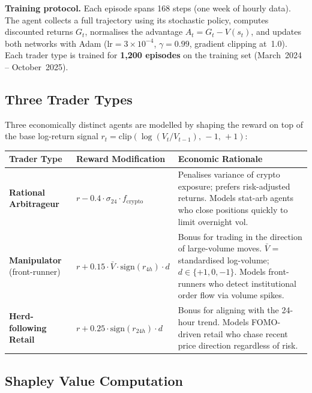 \documentclass[11pt,a4paper]{article}
\begin{document}
\textbf{Training protocol.}  Each episode spans 168 steps (one week of hourly data).  The agent collects a full trajectory using its stochastic policy, computes discounted returns $G_t$, normalises the advantage $A_t = G_t - V(s_t)$, and updates both networks with Adam ($\text{lr}=3\!\times\!10^{-4}$, $\gamma=0.99$, gradient clipping at~1.0).  Each trader type is trained for \textbf{1{,}200 episodes} on the training set (March~2024 -- October~2025).

\subsection{Three Trader Types}

Three economically distinct agents are modelled by shaping the reward on top of the base log-return signal $r_t = \mathrm{clip}\!\left(\log(V_t/V_{t-1}),\,-1,\,+1\right)$:

\begin{table}[h!]
\centering
\small
\renewcommand{\arraystretch}{1.3}
\begin{tabular}{>{\raggedright}p{2.8cm} >{\raggedright}p{5.2cm} >{\raggedright\arraybackslash}p{5.5cm}}
\toprule
\textbf{Trader Type} & \textbf{Reward Modification} & \textbf{Economic Rationale}\\
\midrule
\textcolor{arbblue}{\textbf{Rational Arbitrageur}} &
  $r - 0.4\cdot\sigma_{24}\cdot f_{\text{crypto}}$ &
  Penalises variance of crypto exposure; prefers risk-adjusted returns.  Models stat-arb agents who close positions quickly to limit overnight vol.\\
\textcolor{manipred}{\textbf{Manipulator}} (front-runner) &
  $r + 0.15\cdot\bar{V}\cdot\mathrm{sign}(r_{4h})\cdot d$ &
  Bonus for trading in the direction of large-volume moves.  $\bar{V}$ = standardised log-volume; $d\in\{+1,0,-1\}$.  Models front-runners who detect institutional order flow via volume spikes.\\
\textcolor{herdorange}{\textbf{Herd-following Retail}} &
  $r + 0.25\cdot\mathrm{sign}(r_{24h})\cdot d$ &
  Bonus for aligning with the 24-hour trend.  Models FOMO-driven retail who chase recent price direction regardless of risk.\\
\bottomrule
\end{tabular}
\end{table}

\subsection{Shapley Value Computation}
\end{document}
